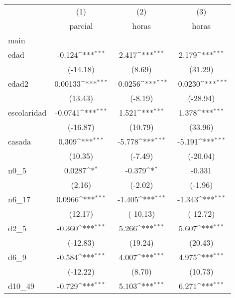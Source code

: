 {
\def\sym#1{\ifmmode^{#1}\else\(^{#1}\)\fi}
\begin{tabular}{l*{3}{c}}
\hline\hline
            &\multicolumn{1}{c}{(1)}&\multicolumn{1}{c}{(2)}&\multicolumn{1}{c}{(3)}\\
            &\multicolumn{1}{c}{parcial}&\multicolumn{1}{c}{horas}&\multicolumn{1}{c}{horas}\\
\hline
main        &                     &                     &                     \\
edad        &      -0.124\sym{***}&       2.417\sym{***}&       2.179\sym{***}\\
            &    (-14.18)         &      (8.69)         &     (31.29)         \\
[1em]
edad2       &     0.00133\sym{***}&     -0.0256\sym{***}&     -0.0230\sym{***}\\
            &     (13.43)         &     (-8.19)         &    (-28.94)         \\
[1em]
escolaridad &     -0.0741\sym{***}&       1.521\sym{***}&       1.378\sym{***}\\
            &    (-16.87)         &     (10.79)         &     (33.96)         \\
[1em]
casada      &       0.309\sym{***}&      -5.778\sym{***}&      -5.191\sym{***}\\
            &     (10.35)         &     (-7.49)         &    (-20.04)         \\
[1em]
n0\_5        &      0.0287\sym{*}  &      -0.379\sym{*}  &      -0.331         \\
            &      (2.16)         &     (-2.02)         &     (-1.96)         \\
[1em]
n6\_17       &      0.0966\sym{***}&      -1.405\sym{***}&      -1.343\sym{***}\\
            &     (12.17)         &    (-10.13)         &    (-12.72)         \\
[1em]
d2\_5        &      -0.360\sym{***}&       5.266\sym{***}&       5.607\sym{***}\\
            &    (-12.83)         &     (19.24)         &     (20.43)         \\
[1em]
d6\_9        &      -0.584\sym{***}&       4.007\sym{***}&       4.975\sym{***}\\
            &    (-12.22)         &      (8.70)         &     (10.73)         \\
[1em]
d10\_49      &      -0.729\sym{***}&       5.103\sym{***}&       6.271\sym{***}\\

\end{tabular}}
